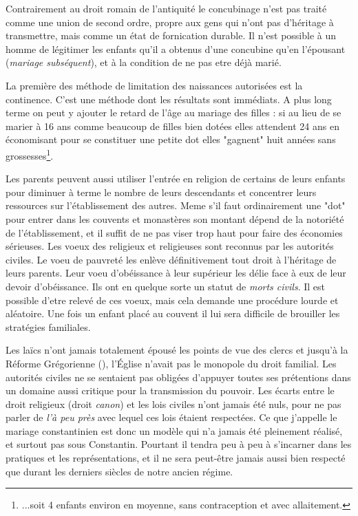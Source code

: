 Contrairement au droit romain de l'antiquité le concubinage n'est pas traité comme une union de second ordre, propre aux gens qui n'ont pas d'héritage à transmettre, mais comme un état de fornication durable. Il n'est possible à un homme de légitimer les enfants qu'il a obtenus d'une concubine qu'en l'épousant (\emph{mariage subséquent}), et à la condition de ne pas etre déjà marié. 



La première des méthode de limitation des naissances autorisées est la continence. C'est une méthode dont les résultats sont immédiats. A plus long terme on peut y ajouter  le retard de l'âge au mariage des filles : si au lieu de se marier à 16 ans comme beaucoup de filles bien dotées elles attendent 24 ans en économisant pour se constituer une petite dot elles "gagnent" huit années sans grossesses\footnote{...soit 4 enfants environ en moyenne, sans contraception et avec allaitement.}. 

Les parents peuvent aussi utiliser l'entrée en religion de certains de leurs enfants pour diminuer à terme le nombre de leurs descendants et concentrer leurs ressources sur l'établissement des autres. Meme s'il faut ordinairement une "dot" pour entrer dans les couvents et monastères son montant dépend de la notoriété de l'établissement, et il suffit de ne pas viser trop haut pour faire des économies sérieuses. 
Les voeux des religieux et religieuses sont reconnus par les autorités civiles. Le voeu de pauvreté les enlève définitivement tout droit à l'héritage de leurs parents. Leur voeu d'obéissance à leur supérieur les délie face à eux de leur devoir d'obéissance. Ils ont en quelque sorte un statut de \emph{morts civils}. Il est possible d'etre relevé de ces voeux, mais cela demande une procédure lourde et aléatoire. Une fois un enfant placé au couvent il lui sera difficile de brouiller les stratégies familiales.  
   



 



Les laïcs n'ont jamais totalement épousé les points de vue des clercs et jusqu'à la Réforme Grégorienne (), l'Église n'avait pas le monopole du droit familial. Les autorités civiles ne se sentaient pas obligées d'appuyer toutes ses prétentions dans un domaine aussi critique pour la transmission du pouvoir. Les écarts entre le droit religieux (droit \emph{canon}) et les lois civiles n'ont jamais été nuls, pour ne pas parler de \emph{l'à peu près} avec lequel ces lois étaient respectées. Ce que j'appelle le mariage constantinien est donc un modèle qui n'a jamais été pleinement réalisé, et surtout pas sous Constantin. Pourtant il tendra peu à peu à s'incarner dans les pratiques et les représentations, et il ne sera peut-être jamais aussi bien respecté que durant les derniers siècles de notre ancien régime.

